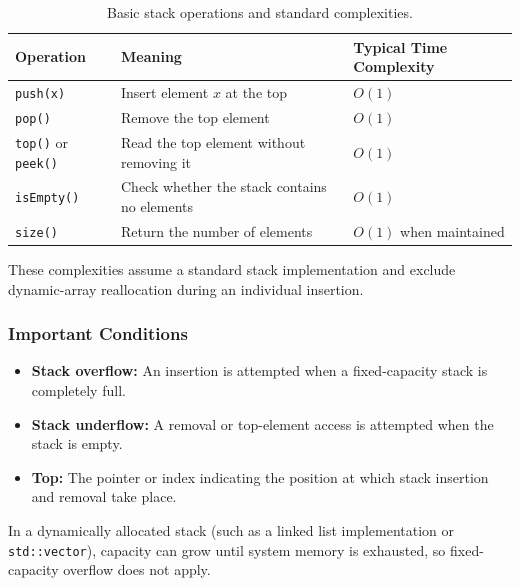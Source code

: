 \begin{table}[htbp]
\centering
\small
\begin{tabularx}{\textwidth}{l p{7.5cm} X}
\toprule
\textbf{Operation} & \textbf{Meaning} & \textbf{Typical Time Complexity} \\
\midrule
\texttt{push(x)}           & Insert element $x$ at the top                & $O(1)$ \\
\texttt{pop()}             & Remove the top element                       & $O(1)$ \\
\texttt{top()} or \texttt{peek()} & Read the top element without removing it     & $O(1)$ \\
\texttt{isEmpty()}         & Check whether the stack contains no elements & $O(1)$ \\
\texttt{size()}            & Return the number of elements                & $O(1)$ when maintained \\
\bottomrule
\end{tabularx}
\caption{Basic stack operations and standard complexities.}
\end{table}

These complexities assume a standard stack implementation and exclude dynamic-array reallocation during an individual insertion.

\subsubsection{Important Conditions}
\begin{itemize}
    \item \textbf{Stack overflow:} An insertion is attempted when a fixed-capacity stack is completely full.
    \item \textbf{Stack underflow:} A removal or top-element access is attempted when the stack is empty.
    \item \textbf{Top:} The pointer or index indicating the position at which stack insertion and removal take place.
\end{itemize}

In a dynamically allocated stack (such as a linked list implementation or \texttt{std::vector}), capacity can grow until system memory is exhausted, so fixed-capacity overflow does not apply.


